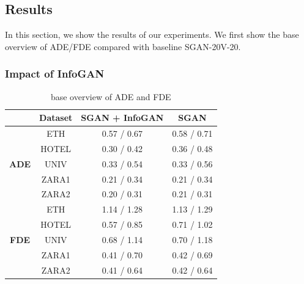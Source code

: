 \subsection{Results}

In this section, we show the results of our experiments. We first show the base overview of ADE/FDE compared with baseline SGAN-20V-20.

\subsubsection{Impact of InfoGAN}

\begin{table}[ht]
  \centering
  \caption{base overview of ADE and FDE} 
  \begin{tabular}{cccc}
  \toprule
  & Dataset & SGAN + InfoGAN &  SGAN \\
  \midrule
  \multirow{5}{*}{\bf ADE} & ETH & 0.57 / 0.67 & 0.58 / 0.71 \\
                         & HOTEL & 0.30 / 0.42 & 0.36 / 0.48 \\
                         & UNIV & 0.33 / 0.54 & 0.33 / 0.56 \\
                         & ZARA1 & 0.21 / 0.34 & 0.21 / 0.34 \\
                         & ZARA2 & 0.20 / 0.31  & 0.21 / 0.31 \\
  \hline
  \multirow{5}{*}{\bf FDE} & ETH & 1.14 / 1.28 & 1.13 / 1.29 \\
                        & HOTEL & 0.57 / 0.85 & 0.71 / 1.02 \\
                        & UNIV & 0.68 / 1.14 & 0.70 / 1.18 \\
                        & ZARA1 & 0.41 / 0.70 & 0.42 / 0.69 \\
                        & ZARA2 & 0.41 / 0.64  & 0.42 / 0.64 \\

  \bottomrule
  \end{tabular}
  \label{table:adefde}
\end{table}
\hfill \\

